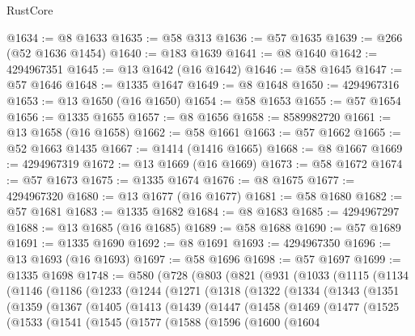 \begin{lexlean}{RustCore}
\begin{coremodule}
@1634 := @8 @1633
@1635 := @58 @313
@1636 := @57 @1635
@1639 := @266 (@52 @1636 @1454)
@1640 := @183 @1639
@1641 := @8 @1640
@1642 := 4294967351
@1645 := @13 @1642 (@16 @1642)
@1646 := @58 @1645
@1647 := @57 @1646
@1648 := @1335 @1647
@1649 := @8 @1648
@1650 := 4294967316
@1653 := @13 @1650 (@16 @1650)
@1654 := @58 @1653
@1655 := @57 @1654
@1656 := @1335 @1655
@1657 := @8 @1656
@1658 := 8589982720
@1661 := @13 @1658 (@16 @1658)
@1662 := @58 @1661
@1663 := @57 @1662
@1665 := @52 @1663 @1435
@1667 := @1414 (@1416 @1665)
@1668 := @8 @1667
@1669 := 4294967319
@1672 := @13 @1669 (@16 @1669)
@1673 := @58 @1672
@1674 := @57 @1673
@1675 := @1335 @1674
@1676 := @8 @1675
@1677 := 4294967320
@1680 := @13 @1677 (@16 @1677)
@1681 := @58 @1680
@1682 := @57 @1681
@1683 := @1335 @1682
@1684 := @8 @1683
@1685 := 4294967297
@1688 := @13 @1685 (@16 @1685)
@1689 := @58 @1688
@1690 := @57 @1689
@1691 := @1335 @1690
@1692 := @8 @1691
@1693 := 4294967350
@1696 := @13 @1693 (@16 @1693)
@1697 := @58 @1696
@1698 := @57 @1697
@1699 := @1335 @1698
@1748 := @580
    (@728
      (@803
        (@821
          (@931
            (@1033
              (@1115
                (@1134
                  (@1146
                    (@1186
                      (@1233
                        (@1244
                          (@1271
                            (@1318
                              (@1322
                                (@1334
                                  (@1343
                                    (@1351
                                      (@1359
                                        (@1367
                                          (@1405
                                            (@1413
                                              (@1439
                                                (@1447
                                                  (@1458
                                                    (@1469
                                                      (@1477
                                                        (@1525
                                                          (@1533
                                                            (@1541
                                                              (@1545
                                                                (@1577
                                                                  (@1588
                                                                    (@1596
                                                                      (@1600
                                                                        (@1604

\end{coremodule}
\end{lexlean}
